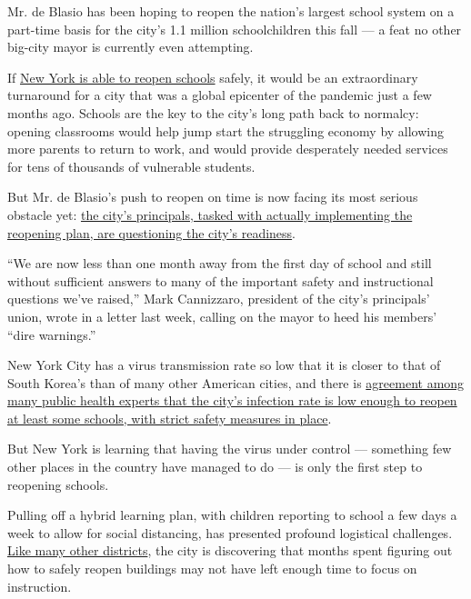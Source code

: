 Mr. de Blasio has been hoping to reopen the nation's largest school
system on a part-time basis for the city's 1.1 million schoolchildren
this fall --- a feat no other big-city mayor is currently even
attempting.

If
\href{https://www.nytimes3xbfgragh.onion/2020/09/01/nyregion/schools-open-coronavirus-nyc.html}{New
York is able to reopen schools} safely, it would be an extraordinary
turnaround for a city that was a global epicenter of the pandemic just a
few months ago. Schools are the key to the city's long path back to
normalcy: opening classrooms would help jump start the struggling
economy by allowing more parents to return to work, and would provide
desperately needed services for tens of thousands of vulnerable
students.

But Mr. de Blasio's push to reopen on time is now facing its most
serious obstacle yet:
\href{https://www.nytimes3xbfgragh.onion/2020/08/14/nyregion/nyc-schools-reopening-plan.html}{the
city's principals, tasked with actually implementing the reopening plan,
are questioning the city's readiness}.

``We are now less than one month away from the first day of school and
still without sufficient answers to many of the important safety and
instructional questions we've raised,'' Mark Cannizzaro, president of
the city's principals' union, wrote in a letter last week, calling on
the mayor to heed his members' ``dire warnings.''

New York City has a virus transmission rate so low that it is closer to
that of South Korea's than of many other American cities, and there is
\href{https://www.nytimes3xbfgragh.onion/2020/08/07/health/coronavirus-ny-schools-reopen.html}{agreement
among many public health experts that the city's infection rate is low
enough to reopen at least some schools, with strict safety measures in
place}.

But New York is learning that having the virus under control ---
something few other places in the country have managed to do --- is only
the first step to reopening schools.

Pulling off a hybrid learning plan, with children reporting to school a
few days a week to allow for social distancing, has presented profound
logistical challenges.
\href{https://www.nytimes3xbfgragh.onion/2020/08/07/us/remote-learning-fall-2020.html}{Like
many other districts}, the city is discovering that months spent
figuring out how to safely reopen buildings may not have left enough
time to focus on instruction.

